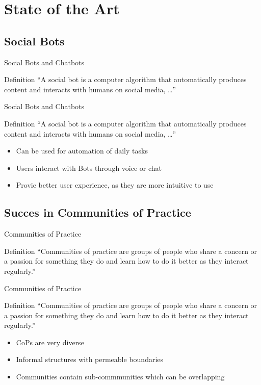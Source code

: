 \section{State of the Art}

\subsection{Social Bots}
\begin{frame}{Social Bots and Chatbots}
  \begin{block}{Definition}
    ``A social bot is a computer algorithm that automatically produces content and interacts with humans on social media, \dots'' \cite{FVD*16b}
  \end{block}
\end{frame}
\begin{frame}{Social Bots and Chatbots}
  \begin{block}{Definition}
    ``A social bot is a computer algorithm that automatically produces content and interacts with humans on social media, \dots'' \cite{FVD*16b}
  \end{block}
  \begin{itemize}
    \item Can be used for automation of daily tasks %
    \item Users interact with Bots through voice or chat %
    \item Provie better user experience, as they are more intuitive to use
  \end{itemize}
\end{frame}

\subsection{Succes in Communities of Practice}
\begin{frame}{Communities of Practice}
  \begin{block}{Definition}
    ``Communities of practice are groups of people who share a concern or a
    passion for something they do and learn how to do it better as they interact regularly.'' \cite{Weng98}
  \end{block}
\end{frame}

\begin{frame}{Communities of Practice}
  \begin{block}{Definition}
    ``Communities of practice are groups of people who share a concern or a
    passion for something they do and learn how to do it better as they interact regularly.'' \cite{Weng98}
  \end{block}
  \begin{itemize}
    \item CoPs are very diverse
    \item Informal structures with permeable boundaries \cite{RKJa15}
    \item Communities contain sub-commmunities which can be overlapping
  \end{itemize}
\end{frame}


